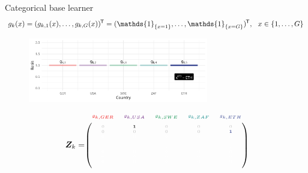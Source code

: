 \documentclass[t,10pt]{beamer}
\begin{document}
\begin{frame}{Categorical base learner}
  \vspace{-0.3cm}\[g_k(x) = (g_{k,1}(x), \dots, g_{k,G}(x))^\tran = (\mathds{1}_{\{x = 1\}}, \dots, \mathds{1}_{\{x = G\}})^\tran, \ \ x\in\{1, \dots, G\}\]
  \begin{center}
    \begin{figure}
      \includegraphics[width=0.7\textwidth]{figures/bs-cat/fig-cat2.png}
    \end{figure}
    \vspace{-0.5cm}
    \[
      \design_k = \tiny\begin{blockarray}{ccccc}
        \color[HTML]{EE0000}g_{k,GER} & \color[HTML]{631879}g_{k,USA} & \color[HTML]{008B45}g_{k,SWE} & \color[HTML]{008280}g_{k,ZAF} & \color[HTML]{3B4992}g_{k,ETH}\\
      \begin{block}{(ccccc)}
        \phantom{x}\\
        \color{lightgray}0 & \color{black}\bm{1} & \color{lightgray}0 & \color{lightgray}0 & \color{lightgray}0 \\
        \color{lightgray}0 & \color{lightgray}0 & \color{lightgray}0 & \color{lightgray}0 & \color[HTML]{3B4992}\bm{1} \\
        \color{white}0 & \color{white}0 & \color{white}0 & \color{white}0 & \color{white}0 \\
        \color{white}\vdots & \color{white}\vdots & \color{white}\vdots & \color{white}\vdots & \color{white}\vdots \\
        \color{white}0 & \color{white}0 & \color{white}0 & \color{white}0 & \color{white}0 \\
        \color{white}0 & \color{white}0 & \color{white}0 & \color{white}0 & \color{white}0 \\
        \color{white}0 & \color{white}0 & \color{white}0 & \color{white}0 & \color{white}0 \color{black}\\
        \phantom{x}\\
      \end{block}
    \end{blockarray}
    \]
    \normalsize
  \end{center}
  \addtocounter{framenumber}{-1}
\end{frame}
\end{document}
